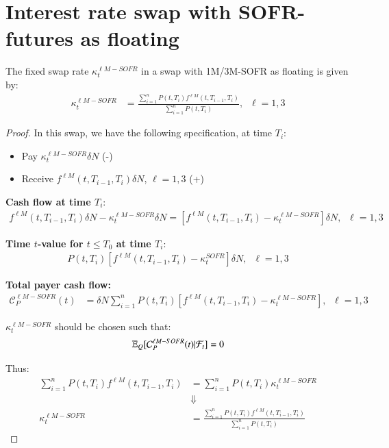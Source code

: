 \newpage 

\section{Interest rate swap with SOFR-futures as floating}


\begin{proposition}
The fixed swap rate $\kappa_{t}^{\ell M-SOFR}$ in a swap with 1M/3M-SOFR as floating is given by:  
\begin{align*}
 \kappa_{t}^{\ell M-SOFR} &= 
 \frac{
 \sum_{i=1}^{n}P(t,T_{i})f^{\ell M}(t,T_{i-1}, T_{i})
 }{
 \sum_{i=1}^{n}P(t,T_{i})
 }, \;\; \ell = 1,3
\end{align*}
\end{proposition}

\begin{proof}
    
In this swap, we have the following specification, at time $T_{i}$:
\begin{itemize}[leftmargin=*]
    \item Pay $\kappa_{t}^{\ell M-SOFR}\delta N$ (-)
    \item Receive $f^{\ell M}(t,T_{i-1}, T_{i})\delta N$, \; $\ell=1,3$ (+)
\end{itemize} 

\textbf{Cash flow at time $T_{i}$}:
\begin{align*}
f^{\ell M}(t, T_{i-1}, T_{i})\delta N - \kappa_{t}^{\ell M-SOFR}\delta N =
[f^{\ell M}(t,T_{i-1}, T_{i}) -\kappa_{t}^{\ell M-SOFR}]\delta N, \;\; \ell =1,3
\end{align*}

\textbf{Time $t$-value for $t\leq T_{0}$ at time $T_{i}$}: 
\begin{align*}
P(t,T_{i})[f^{\ell M}(t,T_{i-1}, T_{i}) - \kappa_{t}^{SOFR}]\delta N,\;\; \ell =1,3
\end{align*}

\textbf{Total payer cash flow:}
\begin{align*}
\mathcal{C}_{P}^{\ell M-SOFR}(t) &= 
\delta N \sum_{i=1}^{n}P(t,T_{i})[f^{\ell M}(t,T_{i-1}, T_{i}) - \kappa_{t}^{\ell M-SOFR}], \;\; \ell =1,3
\end{align*} 

$\kappa_{t}^{\ell M-SOFR}$ should be chosen such that: 
\begin{align*}
\mathbb{E}_{Q}[\mathcal{C}_{P}^{\ell M-SOFR}(t)|\mathcal{F}_{t}] = 0    
\end{align*}

Thus: 
\begin{align*}
\sum_{i=1}^{n}P(t,T_{i})f^{\ell M}(t,T_{i-1}, T_{i}) &= \sum_{i=1}^{n}P(t,T_{i})\kappa_{t}^{\ell M-SOFR} \\ 
&\Downarrow \\ 
\kappa_{t}^{\ell M-SOFR} &= \frac{
\sum_{i=1}^{n}P(t,T_{i})f^{\ell M}(t,T_{i-1}, T_{i})
}{
\sum_{i=1}^{n}P(t,T_{i})
}
\end{align*}
\end{proof}

